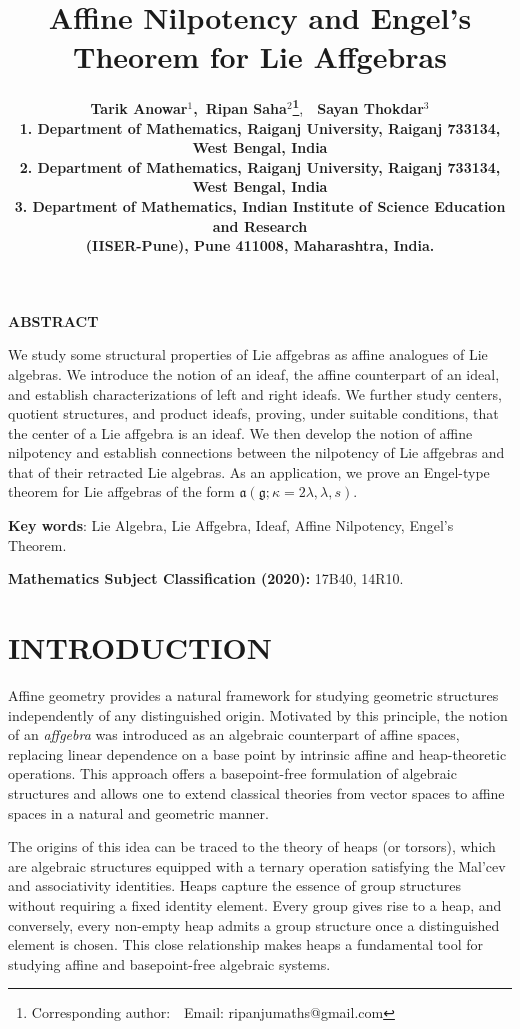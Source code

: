 \documentclass{article}
\title{\textbf{Affine Nilpotency and Engel’s Theorem for Lie Affgebras}}
\author{{\bf Tarik Anowar$^{1}$,~Ripan Saha$^{2}$\footnote{ Corresponding author:~~Email: ripanjumaths@gmail.com}},~~\bf Sayan Thokdar$^{3}$
        \\
{\small 1.  Department of Mathematics, Raiganj University, Raiganj 733134, West Bengal, India}\\
{\small 2. Department of Mathematics, Raiganj University, Raiganj 733134, West Bengal, India}\\
{\small 3. Department of Mathematics, Indian Institute of Science Education and Research} \\{\small(IISER-Pune), Pune 411008,  Maharashtra, India.}}
\theoremstyle{definition}
\theoremstyle{remark}
\theoremstyle{plain}
\begin{document}
\newpage

\maketitle


\begin{center}
\begin{minipage}{12.cm}
\begin{center}{\bf ABSTRACT}\end{center}
We study some structural properties of Lie affgebras as affine analogues of Lie algebras. We introduce the notion of an ideaf, the affine counterpart of an ideal, and establish characterizations of left and right ideafs. We further study centers, quotient structures, and product ideafs, proving, under suitable conditions, that the center of a Lie affgebra is an ideaf. We then develop the notion of affine nilpotency and establish connections between the nilpotency of Lie affgebras and that of their retracted Lie algebras. As an application, we prove an Engel-type theorem for Lie affgebras of the form $\mathfrak{a}(\mathfrak{g};\kappa=2\lambda,\lambda,s)$. 


\medskip

{\bf Key words}: Lie Algebra, Lie Affgebra, Ideaf, Affine Nilpotency, Engel's Theorem.
\medskip

 {\bf Mathematics Subject Classification (2020):} 17B40, 14R10.
\end{minipage}
\end{center}
\normalsize\vskip0.5cm
     
\section{INTRODUCTION}

Affine geometry provides a natural framework for studying geometric structures independently of any distinguished origin. Motivated by this principle, the notion of an \emph{affgebra} \cite{And2, Brz222} was introduced as an algebraic counterpart of affine spaces, replacing linear dependence on a base point by intrinsic affine and heap-theoretic operations. This approach offers a basepoint-free formulation of algebraic structures and allows one to extend classical theories from vector spaces to affine spaces in a natural and geometric manner.

The origins of this idea can be traced to the theory of heaps (or torsors)\cite{Pru1, Bae1}, which are algebraic structures equipped with a ternary operation satisfying the Mal’cev and associativity identities. Heaps capture the essence of group structures without requiring a fixed identity element. Every group gives rise to a heap, and conversely, every non-empty heap admits a group structure once a distinguished element is chosen. This close relationship makes heaps a fundamental tool for studying affine and basepoint-free algebraic systems.
\end{document}
